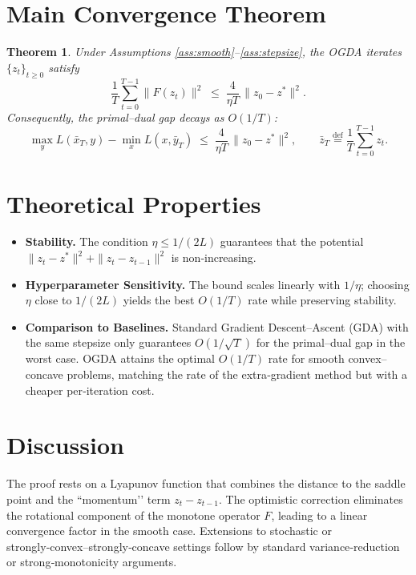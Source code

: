\documentclass{article}
\newtheorem{theorem}{Theorem}
\begin{document}
\section*{Main Convergence Theorem}
\begin{theorem}\label{thm:ogda}
Under Assumptions \ref{ass:smooth}–\ref{ass:stepsize}, the OGDA iterates $\{z_{t}\}_{t\ge0}$ satisfy
\[
\frac{1}{T}\sum_{t=0}^{T-1}\bigl\|F(z_{t})\bigr\|^{2}
\;\le\;
\frac{4}{\eta T}\,\|z_{0}-z^{*}\|^{2}.
\]
Consequently, the primal–dual gap decays as $O(1/T)$:
\[
\max_{y}L(\bar{x}_{T},y)-\min_{x}L(x,\bar{y}_{T})\;\le\;
\frac{4}{\eta T}\,\|z_{0}-z^{*}\|^{2},
\qquad 
\bar{z}_{T}\stackrel{\text{def}}{=}\frac{1}{T}\sum_{t=0}^{T-1}z_{t}.
\]
\end{theorem}

\section*{Theoretical Properties}
\begin{itemize}
\item \textbf{Stability.} The condition $\eta\le 1/(2L)$ guarantees that the potential 
$\|z_{t}-z^{*}\|^{2}+ \|z_{t}-z_{t-1}\|^{2}$ is non‑increasing.
\item \textbf{Hyperparameter Sensitivity.} The bound scales linearly with $1/\eta$;
choosing $\eta$ close to $1/(2L)$ yields the best $O(1/T)$ rate while preserving stability.
\item \textbf{Comparison to Baselines.}
Standard Gradient Descent–Ascent (GDA) with the same stepsize only guarantees
$O(1/\sqrt{T})$ for the primal–dual gap in the worst case.
OGDA attains the optimal $O(1/T)$ rate for smooth convex–concave problems,
matching the rate of the extra‑gradient method but with a cheaper per‑iteration cost.
\end{itemize}

\section*{Discussion}
The proof rests on a Lyapunov function that combines the distance to the saddle point
and the “momentum’’ term $z_{t}-z_{t-1}$.  The optimistic correction eliminates the
rotational component of the monotone operator $F$, leading to a linear convergence factor
in the smooth case.  Extensions to stochastic or strongly‑convex–strongly‑concave settings
follow by standard variance‑reduction or strong‑monotonicity arguments.

\newpage
\end{document}
